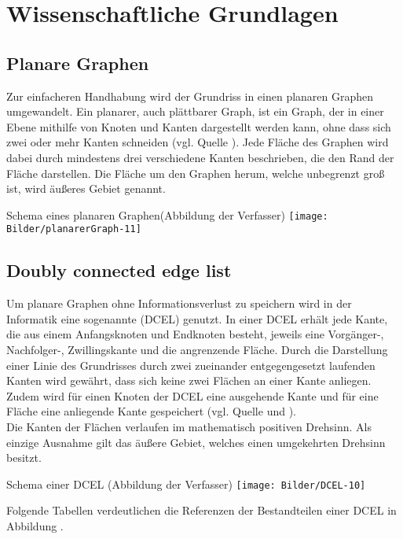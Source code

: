 \chapter{Wissenschaftliche Grundlagen}
\section{Planare Graphen}
Zur einfacheren Handhabung wird der Grundriss in einen planaren Graphen umgewandelt. 
Ein planarer, auch plättbarer Graph, ist ein Graph, der in einer Ebene mithilfe von Knoten und Kanten dargestellt werden kann, ohne dass sich zwei oder mehr Kanten schneiden (vgl. Quelle \cite{planarGraph}). 
Jede Fläche des Graphen wird dabei durch mindestens drei verschiedene Kanten beschrieben, die den Rand der Fläche darstellen. 
Die Fläche um den Graphen herum, welche unbegrenzt groß ist, wird äußeres Gebiet genannt.
\begin{Bild}{Schema eines planaren Graphen(Abbildung der Verfasser)}
	\texttt{[image: Bilder/planarerGraph-11]}
\end{Bild}

\section{Doubly connected edge list}
Um planare Graphen ohne Informationsverlust zu speichern wird in der Informatik eine sogenannte  (DCEL) genutzt.
In einer DCEL erhält jede Kante, die aus einem Anfangsknoten und Endknoten besteht, jeweils eine Vorgänger-, Nachfolger-, Zwillingskante und die angrenzende Fläche. 
Durch die Darstellung einer Linie des Grundrisses durch zwei zueinander entgegengesetzt laufenden Kanten wird gewährt, dass sich keine zwei Flächen an einer Kante anliegen.\\
Zudem wird für einen Knoten der DCEL eine ausgehende Kante und für eine Fläche eine anliegende Kante gespeichert (vgl. Quelle \cite{dcel} und \cite{dcelwiki}). \\
Die Kanten der Flächen verlaufen im mathematisch positiven Drehsinn.
Als einzige Ausnahme gilt das äußere Gebiet, welches einen umgekehrten Drehsinn besitzt.

\begin{Bild}{Schema einer DCEL (Abbildung der Verfasser)}
	\texttt{[image: Bilder/DCEL-10]}
\end{Bild}

Folgende Tabellen verdeutlichen die Referenzen der Bestandteilen einer DCEL in Abbildung \thebildnr.\\\\

